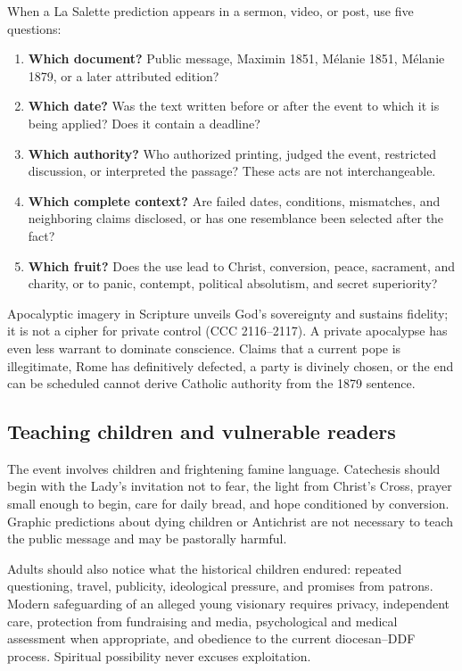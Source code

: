 When a La Salette prediction appears in a sermon, video, or post, use five questions:

\begin{enumerate}
  \item \textbf{Which document?} Public message, Maximin 1851, Mélanie 1851, Mélanie 1879, or a later attributed edition?
  \item \textbf{Which date?} Was the text written before or after the event to which it is being applied? Does it contain a deadline?
  \item \textbf{Which authority?} Who authorized printing, judged the event, restricted discussion, or interpreted the passage? These acts are not interchangeable.
  \item \textbf{Which complete context?} Are failed dates, conditions, mismatches, and neighboring claims disclosed, or has one resemblance been selected after the fact?
  \item \textbf{Which fruit?} Does the use lead to Christ, conversion, peace, sacrament, and charity, or to panic, contempt, political absolutism, and secret superiority?
\end{enumerate}

Apocalyptic imagery in Scripture unveils God's sovereignty and sustains fidelity; it is not a cipher for private control (CCC 2116--2117). A private apocalypse has even less warrant to dominate conscience. Claims that a current pope is illegitimate, Rome has definitively defected, a party is divinely chosen, or the end can be scheduled cannot derive Catholic authority from the 1879 sentence.

\subsection{Teaching children and vulnerable readers}

The event involves children and frightening famine language. Catechesis should begin with the Lady's invitation not to fear, the light from Christ's Cross, prayer small enough to begin, care for daily bread, and hope conditioned by conversion. Graphic predictions about dying children or Antichrist are not necessary to teach the public message and may be pastorally harmful.

Adults should also notice what the historical children endured: repeated questioning, travel, publicity, ideological pressure, and promises from patrons. Modern safeguarding of an alleged young visionary requires privacy, independent care, protection from fundraising and media, psychological and medical assessment when appropriate, and obedience to the current diocesan--DDF process. Spiritual possibility never excuses exploitation.

